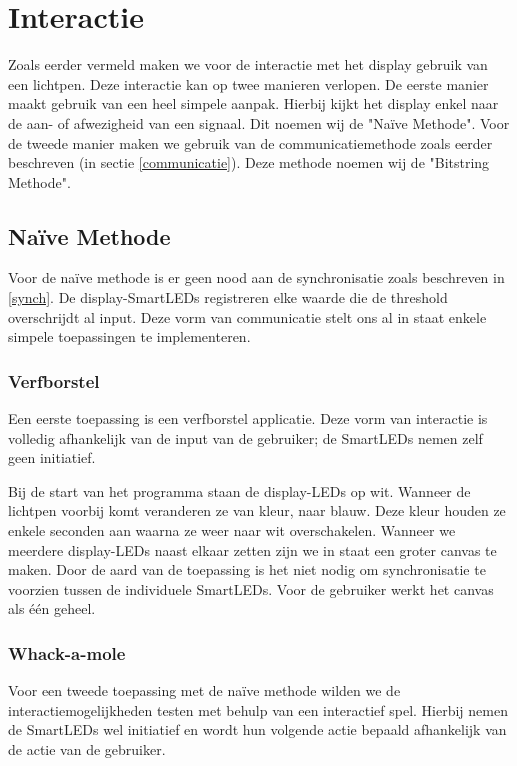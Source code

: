 \documentclass{article}
\begin{document}
\section{Interactie}
Zoals eerder vermeld maken we voor de interactie met het display gebruik van een lichtpen. Deze interactie kan op twee manieren verlopen. De eerste manier maakt gebruik van een heel simpele aanpak. Hierbij kijkt het display enkel naar de aan- of afwezigheid van een signaal. Dit noemen wij de "Na\"ive Methode". Voor de tweede manier maken we gebruik van de communicatiemethode zoals eerder beschreven (in sectie \ref{communicatie}). Deze methode noemen wij de "Bitstring Methode".

\subsection{Na\"ive Methode}

Voor de na\"ive methode is er geen nood aan de synchronisatie zoals beschreven in \ref{synch}. De display-SmartLEDs registreren elke waarde die de threshold overschrijdt al input. Deze vorm van communicatie stelt ons al in staat enkele simpele toepassingen te implementeren.

\subsubsection{Verfborstel}
Een eerste toepassing is een verfborstel applicatie. Deze vorm van interactie is volledig afhankelijk van de input van de gebruiker; de SmartLEDs nemen zelf geen initiatief.

Bij de start van het programma staan de display-LEDs op wit. Wanneer de lichtpen voorbij komt veranderen ze van kleur, naar blauw. Deze kleur houden ze enkele seconden aan waarna ze weer naar wit overschakelen. Wanneer we meerdere display-LEDs naast elkaar zetten zijn we in staat een groter canvas te maken. Door de aard van de toepassing is het niet nodig om synchronisatie te voorzien tussen de individuele SmartLEDs. Voor de gebruiker werkt het canvas als \'e\'en geheel.

\subsubsection{Whack-a-mole}
Voor een tweede toepassing met de na\"ive methode wilden we de interactiemogelijkheden testen met behulp van een interactief spel. Hierbij nemen de SmartLEDs wel initiatief en wordt hun volgende actie bepaald afhankelijk van de actie van de gebruiker. 
\end{document}
